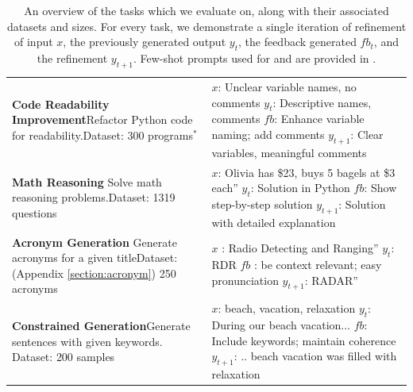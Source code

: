 \begin{table}[!ht]
\begin{tabular}{p{} p{}}
\addlinespace
\textbf{Code Readability Improvement}\newline Refactor Python code for readability.\newline Dataset: \citep{puri2021codenet} 300 programs$^*$   & $x$: Unclear variable names, no comments \newline  $y_t$: Descriptive names, comments \newline $fb$: Enhance variable naming; add comments \newline $y_{t+1}$: Clear variables, meaningful comments \\
\addlinespace
\textbf{Math Reasoning} \newline Solve math reasoning problems.\newline Dataset: \citep{cobbe2021training} 1319 questions & $x$: Olivia has \$23, buys 5 bagels at \$3 each'' \newline  $y_t$: Solution in Python \newline $fb$: Show step-by-step solution \newline $y_{t+1}$: Solution with detailed explanation \\ \addlinespace 

\textbf{Acronym Generation}\newline
Generate acronyms for a given title\newline Dataset: (Appendix \ref{section:acronym}) 250 acronyms  &
$x$ : Radio Detecting and Ranging'' \newline $y_t$: RDR \newline $fb$ : be context relevant; easy pronunciation \newline $y_{t+1}$: RADAR'' \\

\addlinespace

\textbf{Constrained Generation}\newline Generate sentences with given keywords. \newline Dataset: \citep{lin2019commongen} 200 samples & $x$: beach, vacation, relaxation  \newline  $y_t$: During our beach vacation... \newline $fb$: Include keywords; maintain coherence \newline $y_{t+1}$: .. beach vacation was filled with relaxation\\
\bottomrule
\end{tabular}
\caption{An overview of the tasks which we evaluate \ours on, along with their associated datasets and sizes. 
For every task, we demonstrate
a single iteration of refinement of input $x$, the previously generated output $y_t$, the feedback generated  $fb_t$, and the refinement  $y_{t+1}$. Few-shot prompts used for \fbmod and \itermod are provided in .  
}
\label{tab:task_descriptions}
\end{table}